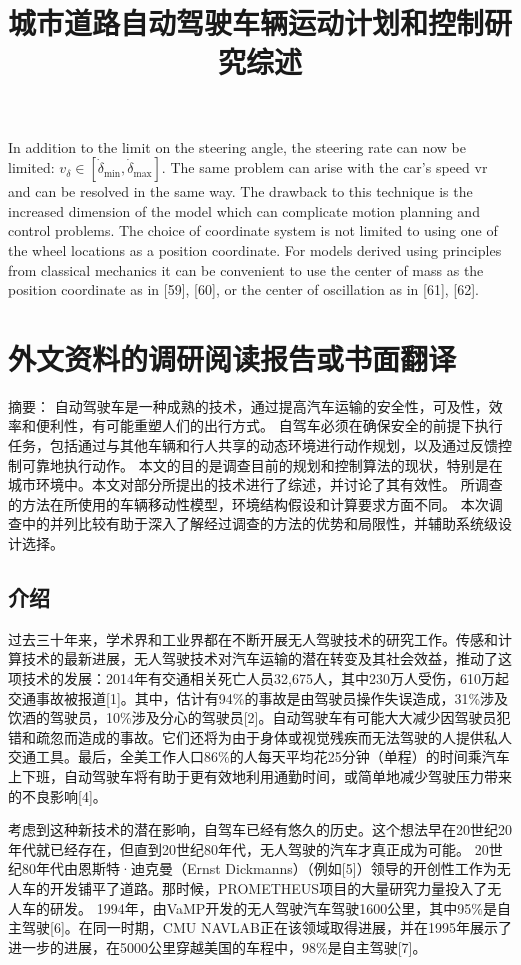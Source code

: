 In addition to the limit on the steering angle, the steering rate can now be limited: $v_{\delta}\in [\dot{\delta}_{\min},\dot{\delta}_{\max}]$. The same problem can arise with the car’s speed vr and can be resolved in the same way. The drawback to this technique is the increased dimension of the model which can complicate motion planning and control problems. The choice of coordinate system is not limited to using one of the wheel locations as a position coordinate. For models derived using principles from classical mechanics it can be convenient to use the center of mass as the position coordinate as in [59], [60], or the center of oscillation as in [61], [62].

\chapter{外文资料的调研阅读报告或书面翻译}

\title{城市道路自动驾驶车辆运动计划和控制研究综述}

{\heiti 摘要：} 自动驾驶车是一种成熟的技术，通过提高汽车运输的安全性，可及性，效率和便利性，有可能重塑人们的出行方式。 自驾车必须在确保安全的前提下执行任务，包括通过与其他车辆和行人共享的动态环境进行动作规划，以及通过反馈控制可靠地执行动作。 本文的目的是调查目前的规划和控制算法的现状，特别是在城市环境中。本文对部分所提出的技术进行了综述，并讨论了其有效性。 所调查的方法在所使用的车辆移动性模型，环境结构假设和计算要求方面不同。 本次调查中的并列比较有助于深入了解经过调查的方法的优势和局限性，并辅助系统级设计选择。

\section{介绍}

过去三十年来，学术界和工业界都在不断开展无人驾驶技术的研究工作。传感和计算技术的最新进展，无人驾驶技术对汽车运输的潜在转变及其社会效益，推动了这项技术的发展：2014年有交通相关死亡人员32,675人，其中230万人受伤，610万起交通事故被报道[1]。其中，估计有94\%的事故是由驾驶员操作失误造成，31\%涉及饮酒的驾驶员，10\%涉及分心的驾驶员[2]。自动驾驶车有可能大大减少因驾驶员犯错和疏忽而造成的事故。它们还将为由于身体或视觉残疾而无法驾驶的人提供私人交通工具。最后，全美工作人口86\%的人每天平均花25分钟（单程）的时间乘汽车上下班，自动驾驶车将有助于更有效地利用通勤时间，或简单地减少驾驶压力带来的不良影响[4]。

考虑到这种新技术的潜在影响，自驾车已经有悠久的历史。这个想法早在20世纪20年代就已经存在，但直到20世纪80年代，无人驾驶的汽车才真正成为可能。 20世纪80年代由恩斯特·迪克曼（Ernst Dickmanns）（例如[5]）领导的开创性工作为无人车的开发铺平了道路。那时候，PROMETHEUS项目的大量研究力量投入了无人车的研发。 1994年，由VaMP开发的无人驾驶汽车驾驶1600公里，其中95\%是自主驾驶[6]。在同一时期，CMU NAVLAB正在该领域取得进展，并在1995年展示了进一步的进展，在5000公里穿越美国的车程中，98\%是自主驾驶[7]。

